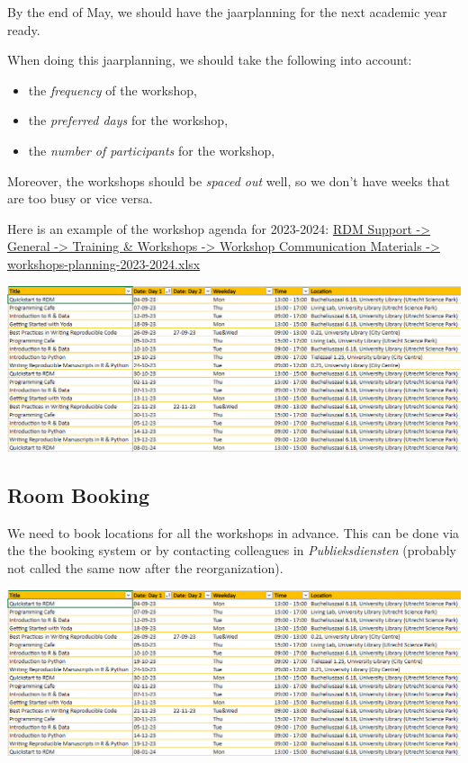 \documentclass[
  letterpaper,
  DIV=11,
  numbers=noendperiod]{scrreprt}
\providecommand{\tightlist}{%
  \setlength{\itemsep}{0pt}\setlength{\parskip}{0pt}}\usepackage{longtable,booktabs,array}
\begin{document}
By the end of May, we should have the jaarplanning for the next academic
year ready.

When doing this jaarplanning, we should take the following into account:

\begin{itemize}
\tightlist
\item
  the \emph{frequency} of the workshop,
\item
  the \emph{preferred days} for the workshop,
\item
  the \emph{number of participants} for the workshop,
\end{itemize}

Moreover, the workshops should be \emph{spaced out} well, so we don't
have weeks that are too busy or vice versa.

Here is an example of the workshop agenda for 2023-2024:
\href{https://solisservices.sharepoint.com/:x:/r/sites/RDMSpeeltuin/Shared\%20Documents/General/Trainings\%20and\%20Workshops/Workshop\%20Communication\%20Materials/workshops-planning-2023-2024.xlsx?d=w0037faec227d49c09d11be856d3c3cbb&csf=1&web=1&e=06E4BJ&nav=MTVfezAwMDAwMDAwLTAwMDEtMDAwMC0wMDAwLTAwMDAwMDAwMDAwMH0}{RDM
Support -\textgreater{} General -\textgreater{} Training \& Workshops
-\textgreater{} Workshop Communication Materials -\textgreater{}
workshops-planning-2023-2024.xlsx}

\includegraphics{images/workshop-agenda.PNG}

\subsection*{Room Booking}\label{room-booking}

We need to book locations for all the workshops in advance. This can be
done via the the booking system or by contacting colleagues in
\emph{Publieksdiensten} (probably not called the same now after the
reorganization).

\includegraphics{images/workshop-agenda.PNG}
\end{document}
